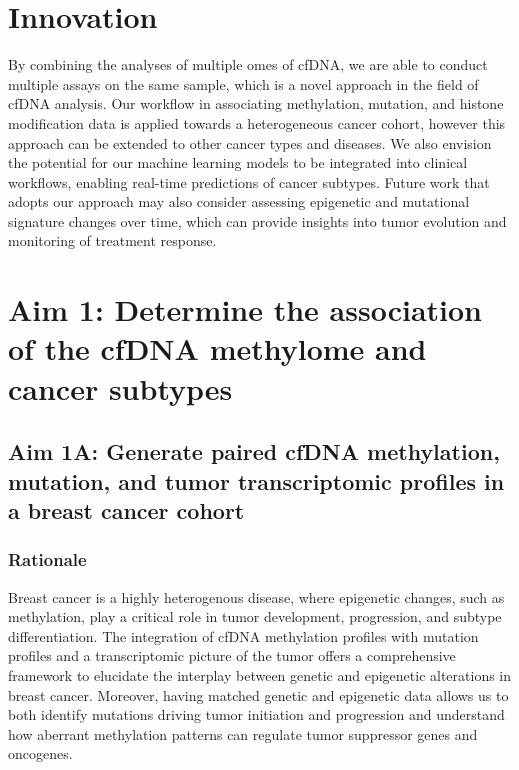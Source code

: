 \documentclass[11pt]{article}
\begin{document}
\section*{Innovation}
By combining the analyses of multiple omes of cfDNA, we are able to conduct
multiple assays on the same sample, which is a novel approach in the field of
cfDNA analysis. Our workflow in associating methylation, mutation, and histone
modification data is applied towards a heterogeneous cancer cohort, however 
this approach can be extended to other cancer types and diseases. We also
envision the potential for our machine learning models to be integrated into
clinical workflows, enabling real-time predictions of cancer subtypes. 
Future work that adopts our approach may also consider assessing epigenetic
and mutational signature changes over time, which can provide insights into
tumor evolution and monitoring of treatment response.

\newpage
\section*{Aim 1: Determine the association of the cfDNA methylome and cancer subtypes}
\subsection*{Aim 1A: Generate paired cfDNA methylation, mutation, and tumor transcriptomic profiles in a breast cancer cohort}
\subsubsection*{Rationale}
Breast cancer is a highly heterogenous disease, where epigenetic changes, such as methylation, 
play a critical role in tumor development, progression, and subtype differentiation.
The integration of cfDNA methylation profiles with mutation profiles and a transcriptomic picture of the tumor offers a comprehensive framework to elucidate the interplay between genetic and epigenetic alterations in breast cancer. 
Moreover, having matched genetic and epigenetic data allows us to both identify mutations driving tumor initiation and progression and understand how aberrant methylation patterns can regulate tumor suppressor genes and oncogenes.
\end{document}
